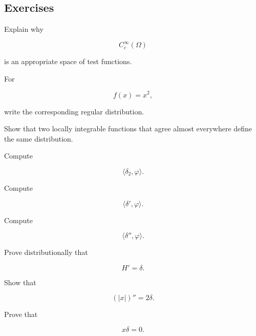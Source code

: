 \subsection{Exercises}
\label{subsec:distribution-theory-exercises}

\begin{exercise}[1]
Explain why

\[
C_c^\infty(\Omega)
\]

is an appropriate space of test functions.
\end{exercise}

\begin{exercise}[1]
For

\[
f(x)=x^2,
\]

write the corresponding regular distribution.
\end{exercise}

\begin{exercise}[1]
Show that two locally integrable functions that agree almost everywhere
define the same distribution.
\end{exercise}

\begin{exercise}[1]
Compute

\[
\langle\delta_2,\varphi\rangle.
\]
\end{exercise}

\begin{exercise}[1]
Compute

\[
\langle\delta',\varphi\rangle.
\]
\end{exercise}

\begin{exercise}[1]
Compute

\[
\langle\delta'',\varphi\rangle.
\]
\end{exercise}

\begin{exercise}[2]
Prove distributionally that

\[
H'=\delta.
\]
\end{exercise}

\begin{exercise}[2]
Show that

\[
(|x|)''=2\delta.
\]
\end{exercise}

\begin{exercise}[2]
Prove that

\[
x\delta=0.
\]
\end{exercise}


